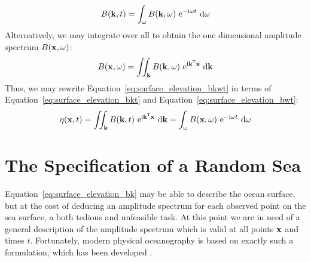 %
\begin{equation}
\label{eq:surface_elevation_bkt}
 B(\mathbf{k}, t) = \int_{\omega} B(\mathbf{k},
\omega)~\mathrm{e}^{-\mathrm{i}\omega t}~\mathrm{d}\omega
\end{equation}
%
Alternatively, we may integrate over all \wavenumbers to obtain the one dimensional
amplitude spectrum $B(\mathbf{x}, \omega)$:
%
\begin{equation}
\label{eq:surface_elevation_bwt}
 B(\mathbf{x}, \omega) = \iint_{\mathbf{k}} B(\mathbf{k},
\omega)~\mathrm{e}^{\mathrm{i}\mathbf{k}^{\mathsf{T}}\mathbf{x}}~\mathrm{d}\mathbf{k}
\end{equation}
%
Thus, we may rewrite Equation~\ref{eq:surface_elevation_bkwt} in terms of
Equation~\ref{eq:surface_elevation_bkt} and Equation~\ref{eq:surface_elevation_bwt}:
%
\begin{equation}
\label{eq:surface_elevation_bk}
  \eta(\mathbf{x}, t) = \iint_{\mathbf{k}} B(\mathbf{k},t)~\mathrm{e}^{\mathrm{i}\mathbf{k}^{\mathsf{T}}\mathbf{x}}~\mathrm{d}\mathbf{k}
  = \int_{\omega} B(\mathbf{x},\omega)~\mathrm{e}^{-\mathrm{i}\omega t}~\mathrm{d}\omega
\end{equation}
%
%
\section{The Specification of a Random Sea}
\label{sec:random_sea}
%
Equation~\ref{eq:surface_elevation_bk} may be able to describe the ocean
surface, but at the cost of deducing an amplitude spectrum for each observed
point on the sea surface, a both tedious and unfeasible task. At
this point we are in need of a general description of the amplitude spectrum
which is valid at all points $\mathbf{x}$ and times $t$.
Fortunately, modern physical oceanography is
based on exactly such a formulation, which has been developed \citet{Neumann:1966}.

